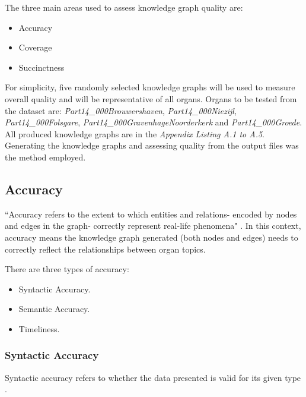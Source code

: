 The three main areas used to assess knowledge graph quality are: 

\vspace{-0.2cm}
\begin{itemize}
    \itemsep0em 
    \item Accuracy
    \vspace{-0.15cm}
    \item Coverage
    \vspace{-0.15cm}
    \item Succinctness
\end{itemize}
\vspace{-0.1cm}

For simplicity, five randomly selected knowledge graphs will be used to measure overall quality and will be representative of all organs. Organs to be tested from the dataset are: \textit{Part14\_000Brouwershaven}, \textit{Part14\_000Niezijl}, \textit{Part14\_000Folsgare}, \textit{Part14\_000GravenhageNoorderkerk} and \textit{Part14\_000Groede}. All produced knowledge graphs are in the \textit{Appendix Listing A.1 to A.5}. Generating the knowledge graphs and assessing quality from the output files was the method employed. 

\subsection{Accuracy}
\hspace{0.5cm} ``Accuracy refers to the extent to which entities and relations- encoded by nodes and edges in the graph- correctly represent real-life phenomena" \cite{knowledgegraphevaulationbook}. In this context, accuracy means the knowledge graph generated (both nodes and edges) needs to correctly reflect the relationships between organ topics. 

\noindent There are three types of accuracy: 

\vspace{-0.2cm}
\begin{itemize}
    \itemsep0em 
\item Syntactic Accuracy.
\vspace{-0.1cm}
\item Semantic Accuracy.
\vspace{-0.1cm}
\item Timeliness.
\end{itemize}
\vspace{-0.4cm}

\subsubsection{Syntactic Accuracy}
\hspace{0.5cm} Syntactic accuracy refers to whether the data presented is valid for its given type \cite{knowledgegraphevaulationbook}.

